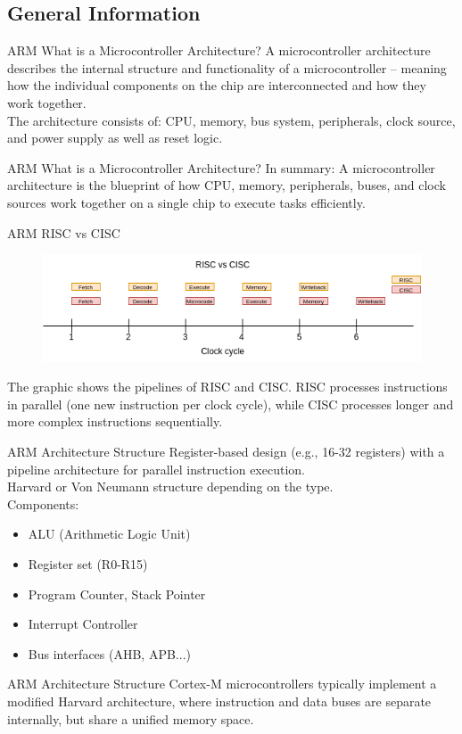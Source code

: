 \documentclass{beamer}
\begin{document}
\subsection{General Information}
\begin{frame}{ARM}
	{What is a Microcontroller Architecture?}
	A microcontroller architecture describes the internal structure and functionality of a microcontroller – meaning how the individual components on the chip are interconnected and how they work together.\\
	\vspace{0.2cm}
	The architecture consists of: CPU, memory, bus system, peripherals, clock source, and power supply as well as reset logic.
\end{frame}
\begin{frame}{ARM}
	{What is a Microcontroller Architecture?}
	In summary: A microcontroller architecture is the blueprint of how CPU, memory, peripherals, buses, and clock sources work together on a single chip to execute tasks efficiently.
\end{frame}
\begin{frame}{ARM}
	{RISC vs CISC}
	\begin{figure}
		\centering
		\includegraphics[width=\linewidth]{RISC_CISC_Pipe.png}
	\end{figure}
	The graphic shows the pipelines of RISC and CISC. RISC processes instructions in parallel (one new instruction per clock cycle), while CISC processes longer and more complex instructions sequentially.
\end{frame}
\begin{frame}{ARM}
	{Architecture Structure}
	Register-based design (e.g., 16-32 registers) with a pipeline architecture for parallel instruction execution.\\
	\vspace{0.2cm}
	Harvard or Von Neumann structure depending on the type.\\
	\vspace{0.2cm}
	Components:
	\begin{itemize}
		\item ALU (Arithmetic Logic Unit)
		\item Register set (R0-R15)
		\item Program Counter, Stack Pointer
		\item Interrupt Controller
		\item Bus interfaces (AHB, APB...)
	\end{itemize}
\end{frame}
\begin{frame}{ARM}
	{Architecture Structure}
	Cortex-M microcontrollers typically implement a modified Harvard architecture, where instruction and data buses are separate internally, but share a unified memory space.
\end{frame}
\end{document}

